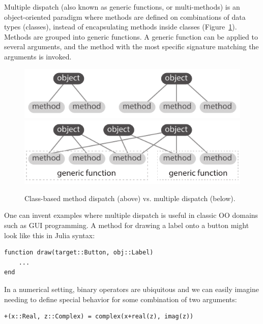 \documentclass[preprint]{sigplanconf}
\begin{document}
Multiple dispatch (also known as generic functions, or multi-methods) is an
object-oriented paradigm where methods are defined on combinations of data
types (classes), instead of encapsulating methods inside classes
(Figure~\ref{fig:dispatch}). Methods are
grouped into generic functions. A generic function can be applied to several
arguments, and the method with the most specific signature matching the
arguments is invoked.

\begin{figure}
  \centering
  \includegraphics[width=\columnwidth]{fig-dispatch-class}
  \includegraphics[width=\columnwidth]{fig-dispatch-multiple}
  \caption{\label{fig:dispatch}Class-based method dispatch (above) vs. multiple dispatch (below).}
\end{figure}

One can invent examples where multiple dispatch is useful in classic OO domains
such as GUI programming. A method for drawing a label onto a button might
look like this in Julia syntax:

\begin{minipage}{\linewidth}
\begin{verbatim}
function draw(target::Button, obj::Label)
    ...
end

\end{verbatim}
\end{minipage}

In a numerical setting, binary operators are ubiquitous and we can easily imagine
needing to define special behavior for some combination of two arguments:

\begin{verbatim}
+(x::Real, z::Complex) = complex(x+real(z), imag(z))
\end{verbatim}
\end{document}
